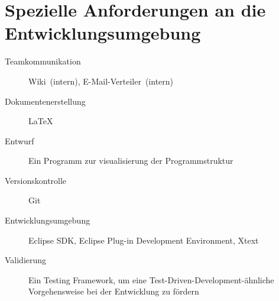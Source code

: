 \section{Spezielle Anforderungen an die Entwicklungsumgebung}%

\begin{description}%
    \item [Teamkommunikation] Wiki~(intern), E-Mail-Verteiler~(intern)
    \item [Dokumentenerstellung] \see \LaTeX{}%
    \item [Entwurf] Ein Programm zur visualisierung der Programmstruktur
    \item [Versionskontrolle] \see Git%
    \item [Entwicklungsumgebung] \see Eclipse SDK, \see Eclipse Plug-in Development Environment, \see Xtext%
    \item [Validierung] Ein Testing Framework, um eine Test-Driven-Development-ähnliche Vorgehensweise bei der Entwicklung zu fördern
\end{description}%
